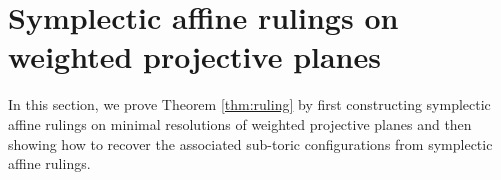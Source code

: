 \documentclass[11pt]{article}
\theoremstyle{definition}
\theoremstyle{remark}
\newtheorem{claim}[theorem]{Claim}
\newcommand{\st}{\mathcal{S}}
\begin{document}

  



\section{Symplectic affine rulings on weighted projective planes}\label{section:ruling}

In this section, we prove Theorem \ref{thm:ruling} by first constructing symplectic affine rulings on minimal resolutions of weighted projective planes and then showing how to recover the associated sub-toric configurations from symplectic affine rulings.
\end{document}
